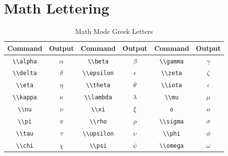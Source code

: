 \chapter{Math Lettering}\label{app:}
\begin{table}[htbp]
	\centering
	\caption{Math Mode Greek Letters}
	\label{tab:greek_letters}
	\begin{tabularx}{\linewidth}{CCCCCC}
		\toprule
		\textbf{Command} & \textbf{Output} & \textbf{Command} & \textbf{Output} & \textbf{Command} & \textbf{Output} \\
		\midrule
		\lstinline|\\alpha| & \(\alpha\) & \lstinline|\\beta| & \(\beta\) & \lstinline|\\gamma| & \(\gamma\) \\
		\lstinline|\\delta| & \(\delta\) & \lstinline|\\epsilon| & \(\epsilon\) & \lstinline|\\zeta| & \(\zeta\) \\
		\lstinline|\\eta| & \(\eta\) & \lstinline|\\theta| & \(\theta\) & \lstinline|\\iota| & \(\iota\) \\
		\lstinline|\\kappa| & \(\kappa\) & \lstinline|\\lambda| & \(\lambda\) & \lstinline|\\mu| & \(\mu\) \\
		\lstinline|\\nu| & \(\nu\) & \lstinline|\\xi| & \(\xi\) & \lstinline|o| & \(o\) \\
		\lstinline|\\pi| & \(\pi\) & \lstinline|\\rho| & \(\rho\) & \lstinline|\\sigma| & \(\sigma\) \\
		\lstinline|\\tau| & \(\tau\) & \lstinline|\\upsilon| & \(\upsilon\) & \lstinline|\\phi| & \(\phi\) \\
		\lstinline|\\chi| & \(\chi\) & \lstinline|\\psi| & \(\psi\) & \lstinline|\\omega| & \(\omega\) \\

\end{tabularx}
\end{table}
